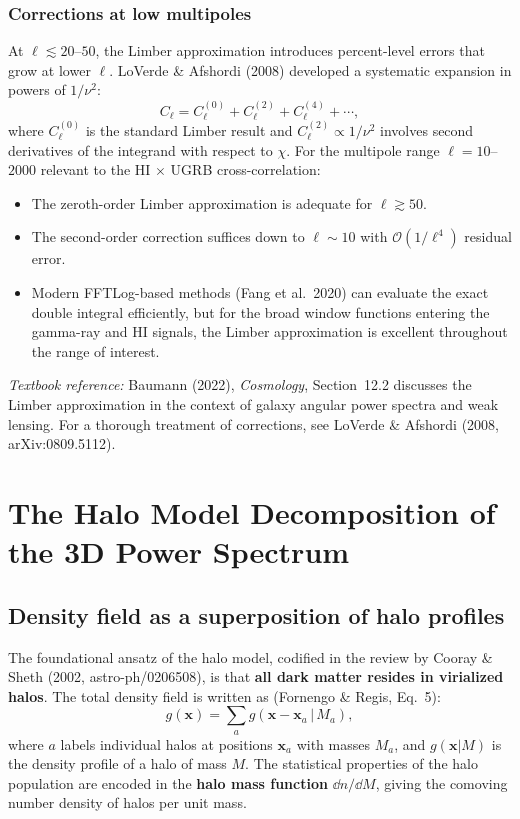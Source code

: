 \documentclass[10pt,a4paper]{article}
\newcommand{\Cl}{C_\ell}
\newcommand{\vect}[1]{\mathbf{#1}}
\begin{document}
\subsubsection{Corrections at low multipoles}

At $\ell \lesssim 20$--$50$, the Limber approximation introduces percent-level errors that grow at lower $\ell$. LoVerde \& Afshordi (2008) developed a systematic expansion in powers of $1/\nu^2$:
\begin{equation}
\Cl = \Cl^{(0)} + \Cl^{(2)} + \Cl^{(4)} + \cdots,
\end{equation}
where $\Cl^{(0)}$ is the standard Limber result and $\Cl^{(2)} \propto 1/\nu^2$ involves second derivatives of the integrand with respect to $\chi$. For the multipole range $\ell = 10$--$2000$ relevant to the HI $\times$ UGRB cross-correlation:
\begin{itemize}[nosep]
    \item The zeroth-order Limber approximation is adequate for $\ell \gtrsim 50$.
    \item The second-order correction suffices down to $\ell \sim 10$ with $\mathcal{O}(1/\ell^4)$ residual error.
    \item Modern FFTLog-based methods (Fang et al.\ 2020) can evaluate the exact double integral efficiently, but for the broad window functions entering the gamma-ray and HI signals, the Limber approximation is excellent throughout the range of interest.
\end{itemize}

\textit{Textbook reference:} Baumann (2022), \textit{Cosmology}, Section~12.2 discusses the Limber approximation in the context of galaxy angular power spectra and weak lensing. For a thorough treatment of corrections, see LoVerde \& Afshordi (2008, arXiv:0809.5112).


\section{The Halo Model Decomposition of the 3D Power Spectrum}
\label{sec:part2}

\subsection{Density field as a superposition of halo profiles}

The foundational ansatz of the halo model, codified in the review by Cooray \& Sheth (2002, astro-ph/0206508), is that \textbf{all dark matter resides in virialized halos}. The total density field is written as (Fornengo \& Regis, Eq.~5):
\begin{equation}
\label{eq:halo_superposition}
g(\vect{x}) = \sum_a g(\vect{x} - \vect{x}_a \,|\, M_a),
\end{equation}
where $a$ labels individual halos at positions $\vect{x}_a$ with masses $M_a$, and $g(\vect{x} | M)$ is the density profile of a halo of mass $M$. The statistical properties of the halo population are encoded in the \textbf{halo mass function} $\dd n/\dd M$, giving the comoving number density of halos per unit mass.
\end{document}
